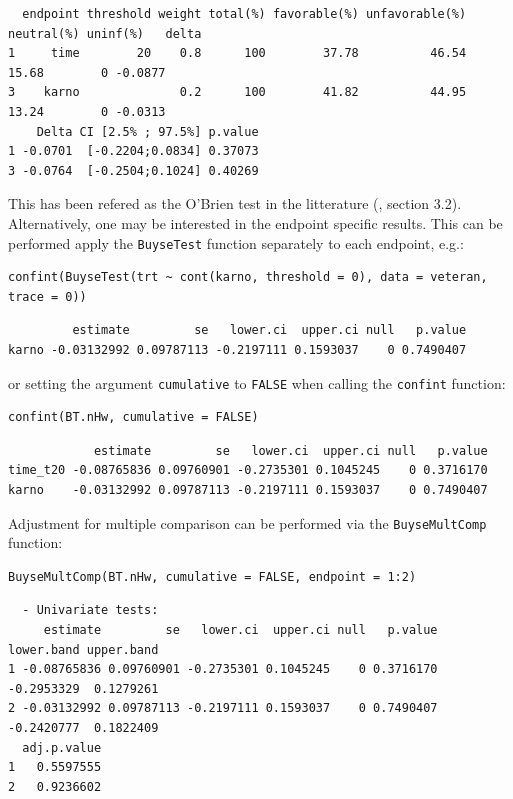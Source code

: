 \documentclass[12pt]{article}
\begin{document}
\begin{verbatim}
  endpoint threshold weight total(%) favorable(%) unfavorable(%) neutral(%) uninf(%)   delta
1     time        20    0.8      100        37.78          46.54      15.68        0 -0.0877
3    karno              0.2      100        41.82          44.95      13.24        0 -0.0313
    Delta CI [2.5% ; 97.5%] p.value
1 -0.0701  [-0.2204;0.0834] 0.37073
3 -0.0764  [-0.2504;0.1024] 0.40269
\end{verbatim}


This has been refered as the O’Brien test in the litterature
(\cite{verbeeck2019generalized}, section 3.2). Alternatively, one may be
interested in the endpoint specific results. This can be performed
apply the \texttt{BuyseTest} function separately to each endpoint, e.g.:
\lstset{language=r,label= ,caption= ,captionpos=b,numbers=none}
\begin{lstlisting}
confint(BuyseTest(trt ~ cont(karno, threshold = 0), data = veteran, trace = 0))
\end{lstlisting}

\begin{verbatim}
         estimate         se   lower.ci  upper.ci null   p.value
karno -0.03132992 0.09787113 -0.2197111 0.1593037    0 0.7490407
\end{verbatim}


or setting the argument \texttt{cumulative} to \texttt{FALSE} when calling the
\texttt{confint} function:
\lstset{language=r,label= ,caption= ,captionpos=b,numbers=none}
\begin{lstlisting}
confint(BT.nHw, cumulative = FALSE)
\end{lstlisting}

\begin{verbatim}
            estimate         se   lower.ci  upper.ci null   p.value
time_t20 -0.08765836 0.09760901 -0.2735301 0.1045245    0 0.3716170
karno    -0.03132992 0.09787113 -0.2197111 0.1593037    0 0.7490407
\end{verbatim}


Adjustment for multiple comparison can be performed via the \texttt{BuyseMultComp} function:
\lstset{language=r,label= ,caption= ,captionpos=b,numbers=none}
\begin{lstlisting}
BuyseMultComp(BT.nHw, cumulative = FALSE, endpoint = 1:2)
\end{lstlisting}

\begin{verbatim}
  - Univariate tests:
     estimate         se   lower.ci  upper.ci null   p.value lower.band upper.band
1 -0.08765836 0.09760901 -0.2735301 0.1045245    0 0.3716170 -0.2953329  0.1279261
2 -0.03132992 0.09787113 -0.2197111 0.1593037    0 0.7490407 -0.2420777  0.1822409
  adj.p.value
1   0.5597555
2   0.9236602
\end{verbatim}
\end{document}
